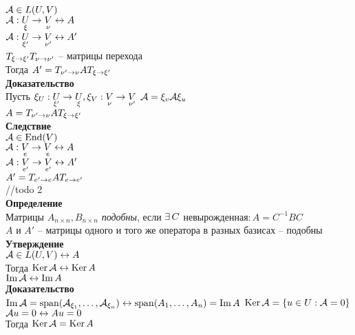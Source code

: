\documentclass[12pt]{article}
\begin{document}
$\mathcal{A} \in L(U, V)$\\
$\mathcal{A}: \underset{\xi}{U} \rightarrow \underset{\nu}{V} \leftrightarrow A$\\
$\mathcal{A}: \underset{\xi'}{U} \rightarrow \underset{\nu'}{V} \leftrightarrow A'$\\
$T_{\xi \rightarrow \xi'} T_{\nu \rightarrow \nu'}$ -- матрицы перехода\\
Тогда $A' = T_{\nu' \rightarrow \nu} A T_{\xi \rightarrow \xi'}$\\
\textbf{Доказательство}\\
Пусть $\xi_U: \underset{\xi'}{U} \rightarrow \underset{\xi}{U},\\
\xi_V: \underset{\nu}{V} \rightarrow \underset{\nu'}{V}$
$\mathcal{A} = \xi_v \mathcal{A} \xi_u$\\
$A = T_{\nu'\rightarrow \nu}AT_{\xi \rightarrow \xi'}$\\
\textbf{Следствие}\\
$\mathcal{A} \in \operatorname{End}(V)$\\
$\mathcal{A}: \underset{e}{V}\rightarrow\underset{e}{V} \leftrightarrow A$\\
$\mathcal{A}: \underset{e'}{V}\rightarrow\underset{e'}{V} \leftrightarrow A'$\\
$A'=T_{e'\rightarrow e}AT_{e\rightarrow e'}$\\
//todo 2\\
\textbf{Определение}\\
Матрицы $A_{n\times n},B_{n \times n}$ \textit{подобны}, если $\exists\, C$ невырожденная$: A=C^{-1}BC$\\
$A$ и $A'$ -- матрицы одного и того же оператора в разных базисах -- подобны\\
\textbf{Утверждение}\\
$\mathcal{A} \in L(U, V) \leftrightarrow A$\\
Тогда $\operatorname{Ker} \mathcal{A} \leftrightarrow \operatorname{Ker} A$\\
$\operatorname{Im} \mathcal{A} \leftrightarrow \operatorname{Im} A$\\
\textbf{Доказательство}\\
$\operatorname{Im} \mathcal{A} = \operatorname{span}(\mathcal{A}_{\xi_1},\ldots, \mathcal{A}_{\xi_n}) \leftrightarrow \operatorname{span}(A_1, \ldots, A_n) = \operatorname{Im} A$
$\operatorname{Ker} \mathcal{A} = \{ u\in U: \mathcal{A} = 0\}$\\
$\mathcal{A} u = 0 \leftrightarrow Au = 0$\\
Тогда $\operatorname{Ker} \mathcal{A} = \operatorname{Ker} A$
\end{document}
